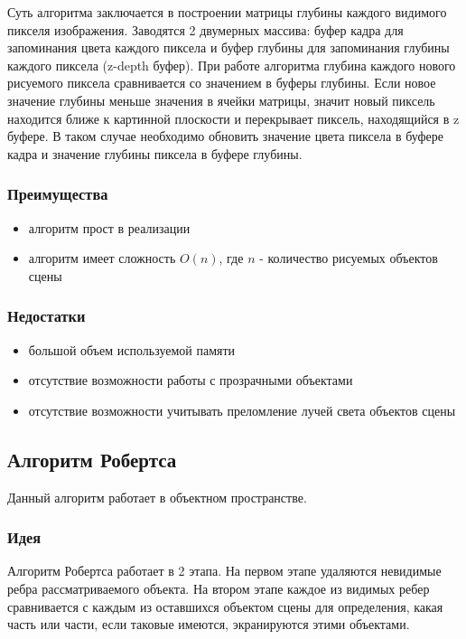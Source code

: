         Суть алгоритма заключается в построении матрицы глубины каждого видимого пикселя изображения. Заводятся 2 двумерных массива: буфер кадра для запоминания цвета каждого пиксела и буфер глубины для запоминания глубины каждого пиксела (z-depth буфер). При работе алгоритма глубина каждого нового рисуемого пиксела сравнивается со значением в буферы глубины. Если новое значение глубины меньше значения в ячейки матрицы, значит новый пиксель находится ближе к картинной плоскости и перекрывает пиксель, находящийся в z буфере. В таком случае необходимо обновить значение цвета пиксела в буфере кадра и значение глубины пиксела в буфере глубины.
  
      \subsubsection{Преимущества}

      \begin{itemize}
        \item алгоритм прост в реализации
        \item алгоритм имеет сложность $O(n)$, где $n$ - количество рисуемых объектов сцены
      \end{itemize}
  
      \subsubsection{Недостатки}
  
      \begin{itemize}
        \item большой объем используемой памяти
        \item отсутствие возможности работы с прозрачными объектами
        \item отсутствие возможности учитывать преломление лучей света объектов сцены
      \end{itemize}
  
    \subsection{Алгоритм Робертса}

      Данный алгоритм работает в объектном пространстве.

      \subsubsection{Идея}
      
        Алгоритм Робертса работает в 2 этапа. На первом этапе удаляются невидимые ребра рассматриваемого объекта. На втором этапе каждое из видимых ребер сравнивается с каждым из оставшихся объектом сцены для определения, какая часть или части, если таковые имеются, экранируются этими объектами.

